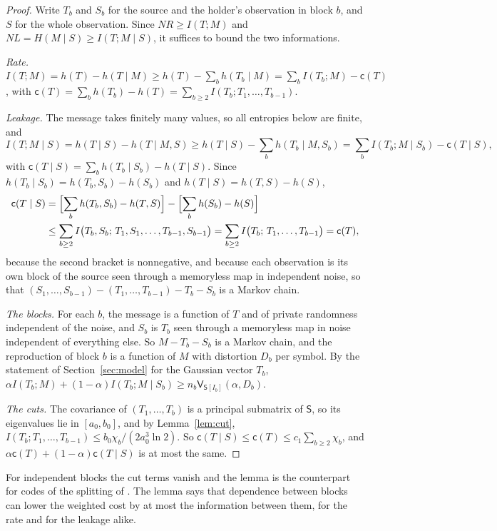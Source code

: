 \documentclass[11pt,onecolumn]{IEEEtran}
\begin{document}
\begin{proof}
Write $T_b$ and $S_b$ for the source and the holder's observation in
block $b$, and $S$ for the whole observation. Since
$NR\ge I(T;M)$ and $NL=H(M\mid S)\ge I(T;M\mid S)$, it suffices to bound
the two informations.

\emph{Rate.}
$I(T;M)=h(T)-h(T\mid M)\ge h(T)-\sum_bh(T_b\mid M)=\sum_bI(T_b;M)-\mathsf c(T)$,
with $\mathsf c(T)=\sum_bh(T_b)-h(T)=\sum_{b\ge2}I(T_b;T_1,\dots,T_{b-1})$.

\emph{Leakage.} The message takes finitely many values, so all
entropies below are finite, and
\[
I(T;M\mid S)=h(T\mid S)-h(T\mid M,S)\ge h(T\mid S)-\sum_bh(T_b\mid M,S_b)
=\sum_bI(T_b;M\mid S_b)-\mathsf c(T\mid S),
\]
with $\mathsf c(T\mid S)=\sum_bh(T_b\mid S_b)-h(T\mid S)$. Since
$h(T_b\mid S_b)=h(T_b,S_b)-h(S_b)$ and $h(T\mid S)=h(T,S)-h(S)$,
\begin{align*}
\mathsf c(T\mid S)&=\Bigl[\sum_bh(T_b,S_b)-h(T,S)\Bigr]-\Bigl[\sum_bh(S_b)-h(S)\Bigr]\\
&\le\sum_{b\ge2}I\bigl(T_b,S_b;\,T_1,S_1,\dots,T_{b-1},S_{b-1}\bigr)
=\sum_{b\ge2}I\bigl(T_b;\,T_1,\dots,T_{b-1}\bigr)=\mathsf c(T),
\end{align*}
because the second bracket is nonnegative, and because each
observation is its own block of the source seen through a memoryless
map in independent noise, so that
$(S_1,\dots,S_{b-1})-(T_1,\dots,T_{b-1})-T_b-S_b$ is a Markov chain.

\emph{The blocks.} For each $b$, the message is a function of $T$ and
of private randomness independent of the noise, and $S_b$ is $T_b$
seen through a memoryless map in noise independent of everything
else. So $M-T_b-S_b$ is a Markov chain, and the reproduction of block
$b$ is a function of $M$ with distortion $D_b$ per symbol. By the
statement of Section~\ref{sec:model} for the Gaussian vector $T_b$,
$\alpha I(T_b;M)+(1-\alpha)I(T_b;M\mid S_b)\ge n_b\mathsf V_{\mathsf S[I_b]}(\alpha,D_b)$.

\emph{The cuts.} The covariance of $(T_1,\dots,T_b)$ is a principal
submatrix of $\mathsf S$, so its eigenvalues lie in $[a_0,b_0]$, and by
Lemma~\ref{lem:cut},
$I(T_b;T_1,\dots,T_{b-1})\le b_0\chi_b/(2a_0^3\ln2)$. So
$\mathsf c(T\mid S)\le\mathsf c(T)\le c_1\sum_{b\ge2}\chi_b$, and
$\alpha\mathsf c(T)+(1-\alpha)\mathsf c(T\mid S)$ is at most the same.
\end{proof}

For independent blocks the cut terms vanish and the lemma is the
counterpart for codes of the splitting of \cite[Theorem~12]{part1}. The
lemma says that dependence
between blocks can lower the weighted cost by at most the information
between them, for the rate and for the leakage alike.
\end{document}
